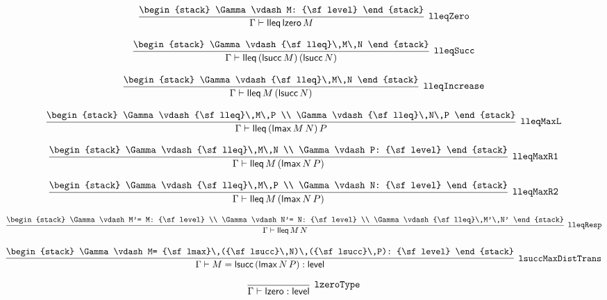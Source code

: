 \[
\infer[{\tt lleqZero}]{\Gamma \vdash {\sf lleq}\,{\sf lzero}\,M}{
\begin{stack}
\Gamma \vdash M: {\sf level}
\end{stack}}
\]

\[
\infer[{\tt lleqSucc}]{\Gamma \vdash {\sf lleq}\,({\sf lsucc}\,M)\,({\sf lsucc}\,N)}{
\begin{stack}
\Gamma \vdash {\sf lleq}\,M\,N
\end{stack}}
\]

\[
\infer[{\tt lleqIncrease}]{\Gamma \vdash {\sf lleq}\,M\,({\sf lsucc}\,N)}{
\begin{stack}
\Gamma \vdash {\sf lleq}\,M\,N
\end{stack}}
\]

\[
\infer[{\tt lleqMaxL}]{\Gamma \vdash {\sf lleq}\,({\sf lmax}\,M\,N)\,P}{
\begin{stack}
\Gamma \vdash {\sf lleq}\,M\,P
\\
\Gamma \vdash {\sf lleq}\,N\,P
\end{stack}}
\]

\[
\infer[{\tt lleqMaxR1}]{\Gamma \vdash {\sf lleq}\,M\,({\sf lmax}\,N\,P)}{
\begin{stack}
\Gamma \vdash {\sf lleq}\,M\,N
\\
\Gamma \vdash P: {\sf level}
\end{stack}}
\]

\[
\infer[{\tt lleqMaxR2}]{\Gamma \vdash {\sf lleq}\,M\,({\sf lmax}\,N\,P)}{
\begin{stack}
\Gamma \vdash {\sf lleq}\,M\,P
\\
\Gamma \vdash N: {\sf level}
\end{stack}}
\]

\[
\infer[{\tt lleqResp}]{\Gamma \vdash {\sf lleq}\,M\,N}{
\begin{stack}
\Gamma \vdash M'= M: {\sf level}
\\
\Gamma \vdash N'= N: {\sf level}
\\
\Gamma \vdash {\sf lleq}\,M'\,N'
\end{stack}}
\]

\[
\infer[{\tt lsuccMaxDistTrans}]{\Gamma \vdash M= {\sf lsucc}\,({\sf lmax}\,N\,P): {\sf level}}{
\begin{stack}
\Gamma \vdash M= {\sf lmax}\,({\sf lsucc}\,N)\,({\sf lsucc}\,P): {\sf level}
\end{stack}}
\]

\[
\infer[{\tt lzeroType}]{\Gamma \vdash {\sf lzero}: {\sf level}}{}
\]

